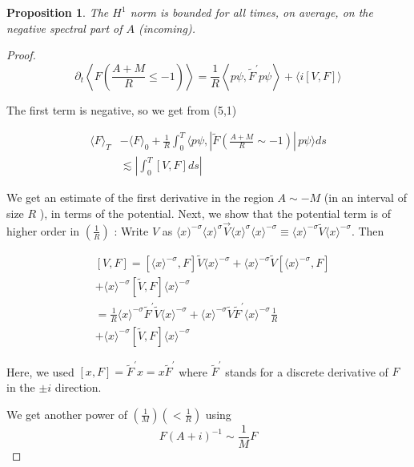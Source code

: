 \documentclass[11pt]{article}
\newtheorem{proposition}[theorem]{Proposition}
\begin{document}
\begin{proposition}

The $H^{1}$ norm is bounded for all times, on average, on the negative spectral part of $A$ (incoming).
\end{proposition}
\begin{proof}
\begin{equation}
\partial_{t}\left\langle F\left(\frac{A+M}{R} \leqslant-1\right)\right\rangle=\frac{1}{R}\left\langle p \psi, \tilde{F}^{\prime} p \psi\right\rangle+\langle i[V, F]\rangle \tag{5,1}
\end{equation}

The first term is negative, so we get from (5,1)

\begin{align}
\langle F\rangle_{T} & -\langle F\rangle_{0}+\frac{1}{R} \int_{0}^{T}\langle p \psi,| \tilde{F}\left(\frac{A+M}{R} \sim-1\right)|\, p \psi\rangle d s \\
& \lesssim\left|\int_{0}^{T}[V, F] d s\right| \tag{5,2}
\end{align}


We get an estimate of the first derivative in the region $A \sim-M$ (in an interval of size $R$ ), in terms of the potential.
Next, we show that the potential term is of higher order in $\left(\frac{1}{R}\right)$ :
Write $V$ as $\langle x)^{-\sigma}\langle x\rangle^{\sigma} \vec{V}\langle x\rangle^{\sigma}\langle x\rangle^{-\sigma} \equiv\langle x\rangle^{-\sigma} \tilde{V}\langle x\rangle^{-\sigma}$.
Then

\begin{align*}
& {[V, F]=\left[\langle x\rangle^{-\sigma}, F\right] \tilde{V}\langle x\rangle^{-\sigma}+\langle x\rangle^{-\sigma} \tilde{V}\left[\langle x\rangle^{-\sigma}, F\right]} \\
& +\langle x\rangle^{-\sigma}[\tilde{V}, F]\langle x\rangle^{-\sigma} \\
& =\frac{1}{R}\langle x\rangle^{-\sigma} \tilde{F}^{\prime} \tilde{V}\langle x\rangle^{-\sigma}+\langle x\rangle^{-\sigma} \tilde{V} \tilde{F}^{\prime}\langle x\rangle^{-\sigma} \frac{1}{R} \\
& +\langle x\rangle^{-\sigma}[\tilde{V}, F]\langle x\rangle^{-\sigma} \tag{5,3}
\end{align*}


Here, we used $[x, F]=\tilde{F}^{\prime} x=x \tilde{F}^{\prime}$ where $\tilde{F}^{\prime}$ stands for a discrete derivative of $F$ in the $\pm i$ direction.

We get another power of $\left(\frac{1}{M}\right)\left(<\frac{1}{R}\right)$ using
$$
F(A+i)^{-1} \sim \frac{1}{M} F
$$


\end{proof}
\end{document}
